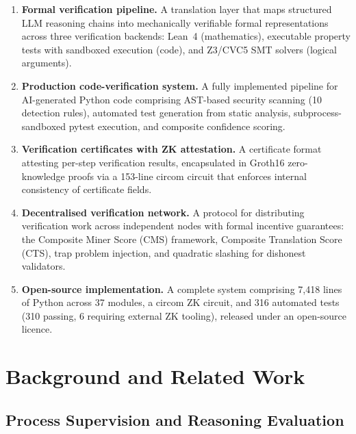 \documentclass[11pt,a4paper]{article}
\begin{document}
\begin{enumerate}[leftmargin=*,nosep]
  \item \textbf{Formal verification pipeline.} A translation layer that
    maps structured LLM reasoning chains into mechanically verifiable
    formal representations across three verification backends: Lean~4
    (mathematics), executable property tests with sandboxed execution
    (code), and Z3/CVC5 SMT solvers (logical arguments).

  \item \textbf{Production code-verification system.} A fully
    implemented pipeline for AI-generated Python code comprising
    AST-based security scanning (10 detection rules), automated test
    generation from static analysis, subprocess-sandboxed pytest
    execution, and composite confidence scoring.

  \item \textbf{Verification certificates with ZK attestation.} A
    certificate format attesting per-step verification results,
    encapsulated in Groth16 zero-knowledge proofs via a 153-line circom
    circuit that enforces internal consistency of certificate fields.

  \item \textbf{Decentralised verification network.} A protocol for
    distributing verification work across independent nodes with formal
    incentive guarantees: the Composite Miner Score (CMS) framework,
    Composite Translation Score (CTS), trap problem injection, and
    quadratic slashing for dishonest validators.

  \item \textbf{Open-source implementation.} A complete system comprising
    7{,}418 lines of Python across 37 modules, a circom ZK circuit,
    and 316 automated tests (310 passing, 6 requiring external ZK
    tooling), released under an open-source licence.
\end{enumerate}

\section{Background and Related Work}
\label{sec:related}

\subsection{Process Supervision and Reasoning Evaluation}
\end{document}

